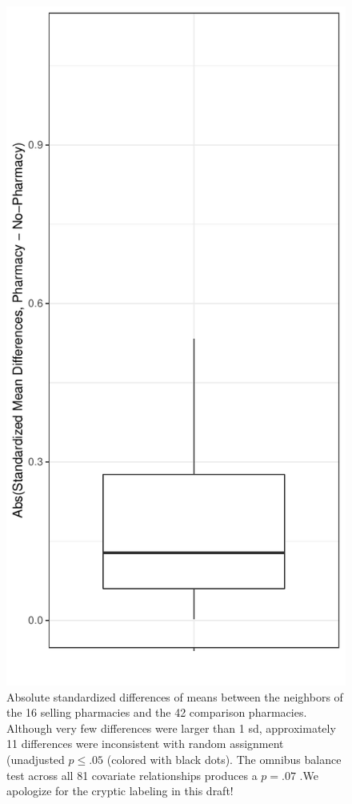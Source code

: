 \documentclass[11pt]{article}
\begin{document}
\begin{figure}[htbp!]
\centering
\includegraphics[width=.8\textwidth]{./media/initial_balance_plot.pdf}
\caption{Absolute standardized differences of means between the neighbors of the 16 selling pharmacies and the 42 comparison pharmacies. Although very few differences were larger than 1 sd, approximately 11 differences were inconsistent with random assignment (unadjusted $p \le .05$ (colored with black dots). The omnibus balance test across all 81 covariate relationships produces a $p=.07$ \citep{hansen2008cbs}.We apologize for the cryptic labeling in this draft!} \label{fig:initbal}
\end{figure}
\end{document}
